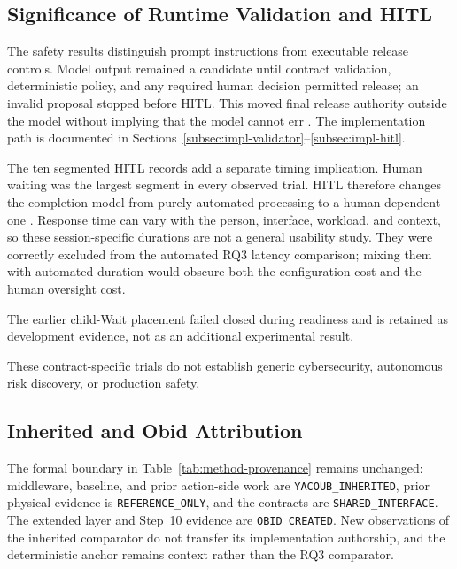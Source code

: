 \subsection{Significance of Runtime Validation and HITL}\label{subsec:discussion-safety}

The safety results distinguish prompt instructions from executable release
controls. Model output remained a candidate until contract validation,
deterministic policy, and any required human decision permitted release; an
invalid proposal stopped before HITL. This moved final release authority outside
the model without implying that the model cannot err
\cite{wright2022jsonschemavalidation,schneider2000enforceable,wang2026agentspec}. The implementation path is
documented in Sections~\ref{subsec:impl-validator}--\ref{subsec:impl-hitl}.

The ten segmented HITL records add a separate timing implication. Human waiting
was the largest segment in every observed trial. HITL therefore changes the
completion model from purely automated processing to a human-dependent one
\cite{amershi2019guidelines,dzindolet2003trust,nist2023airmf}.
Response time can vary with the person, interface, workload, and context, so
these session-specific durations are not a general usability study. They were
correctly excluded from the automated RQ3 latency comparison; mixing them with
automated duration would obscure both the configuration cost and the human
oversight cost.

The earlier child-Wait placement failed closed during readiness and is retained
as development evidence, not as an additional experimental result.

These contract-specific trials do not establish generic cybersecurity,
autonomous risk discovery, or production safety.

\subsection{Inherited and Obid Attribution}\label{subsec:discussion-provenance}

The formal boundary in Table~\ref{tab:method-provenance} remains unchanged:
middleware, baseline, and prior action-side work are
\texttt{YACOUB\_INHERITED}, prior physical evidence is
\texttt{REFERENCE\_ONLY}, and the contracts are \texttt{SHARED\_INTERFACE}.
The extended layer and Step~10 evidence are \texttt{OBID\_CREATED}. New
observations of the inherited comparator do not transfer its implementation
authorship, and the deterministic anchor remains context rather than the RQ3
comparator.

